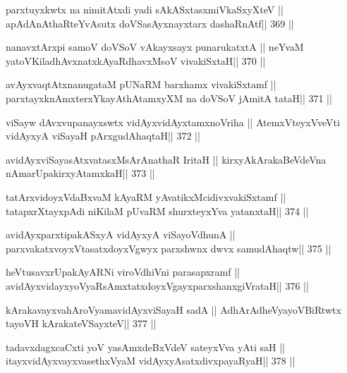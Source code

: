 \begin{shl}
parxtuyxkwtx na nimitAtxdi yadi sAkASxtasxmiVkaSxyXteV ||
apAdAnAthaRteYvAsutx doVSasAyxnayxtarx dashaRnAtf\hfill || 369 ||
\end{shl}

\begin{shl}
nanavxtArxpi samoV doVSoV vAkayxsayx punarukatxtA ||
neYvaM yatoV\s KiladhAvxnatxkAyaRdhavxMsoV vivakiSxtaH\hfill || 370 ||
\end{shl}

\begin{shl}
avAyxvaqtAtxnanugataM pUNaRM barxhamx vivakiSxtamf ||
parxtayxknAmxterxYkayAthAtamxyXM na doVSoV jAmitA tataH\hfill || 371 ||
\end{shl}

\begin{shl}
viSayw dAvxvupanayxswtx vidAyxvidAyxtamxnoVriha ||
AtemxVteyxVveVti vidAyxyA viSayaH pArxgudAhaqtaH\hfill || 372 ||
\end{shl}

\begin{shl}
avidAyxviSayasAtxvatasxMsArAnathaR IritaH ||
kirxyAkArakaBeVdeVna nAmarUpakirxyAtamxkaH\hfill || 373 ||
\end{shl}

\begin{shl}
tatArxvidoyxVdaBxvaM kAyaRM yAvatikxMcidivxvakiSxtamf ||
tatapxrXtayxpAdi niKilaM pUvaRM shurxteyxYva yatanxtaH\hfill || 374 ||
\end{shl}

\begin{shl}
avidAyxparxtipakASxyA vidAyxyA viSayoV\s dhunA ||
parxvakatxvoyxV\s tasatxdoyxVgwyx parxshwnx dwvx samudAhaqtw\hfill || 375 ||
\end{shl}

\begin{shl}
heVtusavxrUpakAyARNi viroVdhiVni parasapxramf ||
avidAyxvidayxyoVyaRsAmxtatxdoyxVgayxparxshanxgiVrataH\hfill || 376 ||
\end{shl}

\begin{shl}
kArakavayxvahAroV\s yamavidAyxviSayaH sadA ||
AdhArAdheVyayoVBiRtwtx tayoVH kArakateVSayxteV\hfill || 377 ||
\end{shl}

\begin{shl}
tadavxdagxcaCxti yoV yasAmxdeBxVdeV sateyxVva yAti saH ||
itayxvidAyxvayxvasethxVyaM vidAyxyAsatxdivxpayaRyaH\hfill || 378 ||
\end{shl}


